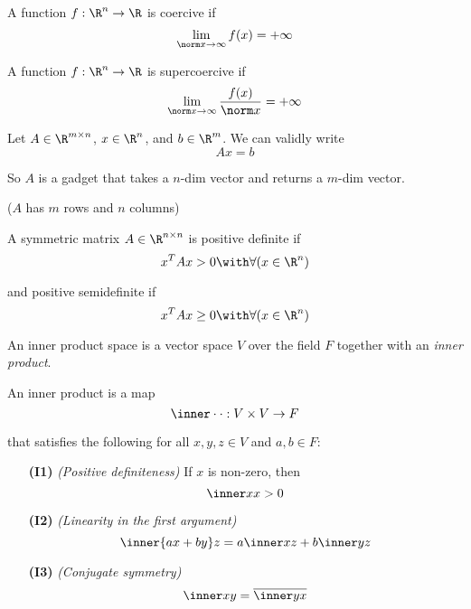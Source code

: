 \label{e9c7871}

A function $f:\R^n\to\R$ is coercive if
$$
  \lim_{\norm x\to\infty}f(x)=+\infty
$$

\label{a0444cc}

A function $f:\R^n\to\R$ is supercoercive if
$$
  \lim_{\norm x\to\infty}\frac{f(x)}{\norm x}=+\infty
$$


\label{d8bd136}

Let $A\in\R^{m\times n}$, $x\in\R^n$, and $b\in\R^m$. We can validly write
$$
  Ax = b
$$

So $A$ is a gadget that takes a $n$-dim vector and returns a $m$-dim vector.

($A$ has $m$ rows and $n$ columns)

\label{e25e722}

A symmetric matrix $A\in\R^{n\times n}$ is positive definite if
$$
  x^TAx>0\with\forall(x\in\R^n)
$$

and positive semidefinite if
$$
  x^TAx\geq0\with\forall(x\in\R^n)
$$

\label{cebd07a}

An inner product space is a vector space $V$ over the field $F$ together with
an \textit{inner product}.

An inner product is a map
$$
  \inner\cdot\cdot:V\times V\to F
$$

that satisfies the following for all $x,y,z\in V$ and $a,b\in F$:
\begin{enumerate}
  \item[\textbf{(I1)}] \textit{(Positive definiteness)} If $x$ is
        non-zero, then
        $$
          \inner xx>0
        $$
  \item[\textbf{(I2)}] \textit{(Linearity in the first argument)}
        $$
          \inner{ax+by}z = a\inner xz + b\inner yz
        $$
  \item[\textbf{(I3)}] \textit{(Conjugate symmetry)}
        $$
          \inner xy=\overline{\inner yx}
        $$
\end{enumerate}


